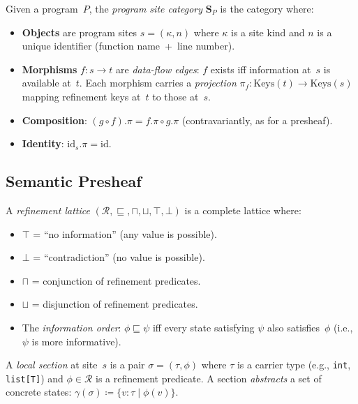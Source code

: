 \documentclass[acmsmall,screen,review,anonymous]{acmart}
\theoremstyle{remark}
\newcommand{\defeq}{\coloneqq}
\begin{document}
\begin{definition}\label{def:site-cat}
Given a program~$P$, the \emph{program site category} $\mathbf{S}_P$ is
the category where:
\begin{itemize}[nosep]
  \item \textbf{Objects} are program sites $s = (\kappa, n)$ where
    $\kappa$ is a site kind and $n$ is a unique identifier (function
    name~+~line number).
  \item \textbf{Morphisms} $f : s \to t$ are \emph{data-flow edges}:
    $f$ exists iff information at~$s$ is available at~$t$.  Each
    morphism carries a \emph{projection} $\pi_f : \mathrm{Keys}(t) \to
    \mathrm{Keys}(s)$ mapping refinement keys at~$t$ to those at~$s$.
  \item \textbf{Composition}: $(g \circ f).\pi = f.\pi \circ g.\pi$
    (contravariantly, as for a presheaf).
  \item \textbf{Identity}: $\mathrm{id}_s.\pi = \mathrm{id}$.
\end{itemize}
\end{definition}

\subsection{Semantic Presheaf}\label{sec:presheaf}

\begin{definition}\label{def:ref-lattice}
A \emph{refinement lattice} $(\mathcal{R}, \sqsubseteq, \sqcap,
\sqcup, \top, \bot)$ is a complete lattice where:
\begin{itemize}[nosep]
  \item $\top$ = ``no information'' (any value is possible).
  \item $\bot$ = ``contradiction'' (no value is possible).
  \item $\sqcap$ = conjunction of refinement predicates.
  \item $\sqcup$ = disjunction of refinement predicates.
  \item The \emph{information order}: $\phi \sqsubseteq \psi$ iff
    every state satisfying $\psi$ also satisfies~$\phi$ (i.e.,
    $\psi$ is more informative).
\end{itemize}
\end{definition}

\begin{definition}\label{def:local-section}
A \emph{local section} at site~$s$ is a pair
$\sigma = (\tau, \phi)$ where $\tau$ is a carrier type
(e.g., \texttt{int}, \texttt{list[T]}) and $\phi \in \mathcal{R}$
is a refinement predicate.  A section \emph{abstracts} a set of
concrete states: $\gamma(\sigma) \defeq \{ v : \tau \mid \phi(v) \}$.
\end{definition}
\end{document}
